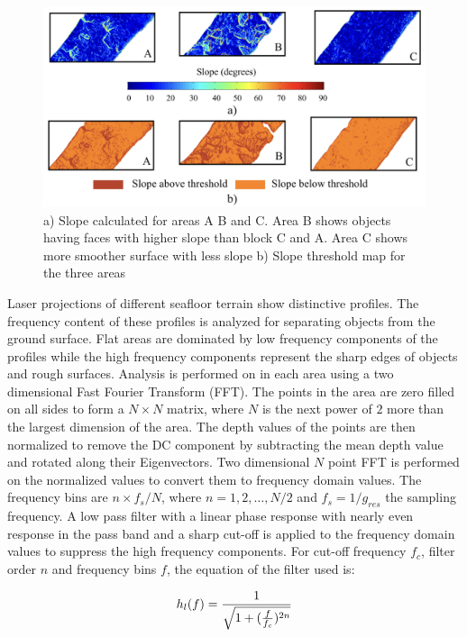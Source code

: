 \begin{figure}[!ht]
\centering
\includegraphics[width=6in]{./images/mehul15.png}
\caption{a) Slope calculated for areas A B and C. Area B shows objects having faces with higher slope than block C and A. Area C shows more smoother surface with less slope b) Slope threshold map for the three areas }
\label{f:slope_analysis}
\end{figure}

Laser projections of different seafloor terrain show distinctive profiles. The frequency content of these profiles is analyzed for separating objects from the ground surface. Flat areas are dominated by low frequency components of the profiles while the high frequency components represent the sharp edges of objects and rough surfaces. Analysis is performed on in each area using a two dimensional Fast Fourier Transform (FFT). The points in the area are zero filled on all sides to form a $N \times N$ matrix, where $N$ is the next power of $2$ more than the largest dimension of the area. The depth values of the points are then normalized to remove the DC component by subtracting the mean depth value and rotated along their Eigenvectors. Two dimensional $N$ point FFT is performed on the normalized values to convert them to frequency domain values. The frequency bins are $n \times f_s/N$, where $n = 1, 2, \dots, N/2$ and $f_s = 1/g_{res}$ the sampling frequency. A low pass filter with a linear phase response with nearly even response in the pass band and a sharp cut-off is applied to the frequency domain values to suppress the high frequency components. For cut-off frequency $f_c$, filter order $n$ and frequency bins $f$, the equation of the filter used is:

\begin{equation}
\label{eq:eq8}
\centering
	h_{l}(f) = \frac{1}{\sqrt{1 + (\frac{f}{f_c})^{2n}}} 
\end{equation}

